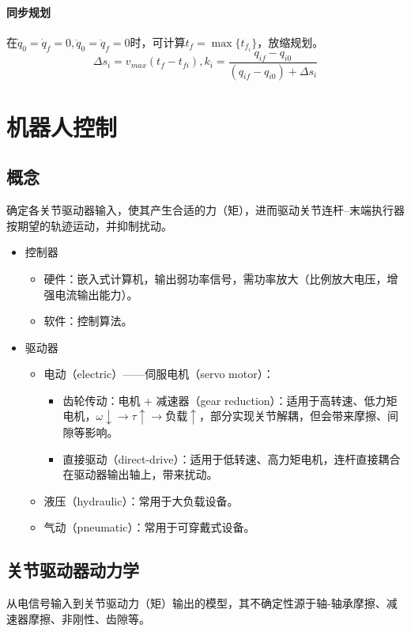 \documentclass[
12pt, %
a4paper, 
oneside, %
headinclude,footinclude, %
]{scrartcl}
\begin{document}
\paragraph{同步规划}
在$ \dot{q}_0 = \dot{q}_f = 0, \ddot{q}_0 = \ddot{q}_f = 0 $时，可计算$ t_f = \max\{t_{f_i}\} $，放缩规划。
$$ \Delta s_i = v_{max}(t_f - t_{fi}), k_i = \frac{q_{if} - q_{i0}}{(q_{if} - q_{i0}) + \Delta s_i} $$
\section{机器人控制}
\subsection[概念]{概念}
确定各关节驱动器输入，使其产生合适的力（矩），进而驱动关节连杆--末端执行器按期望的轨迹运动，并抑制扰动。
\begin{itemize}
\item 控制器
\begin{itemize}
\item 硬件：嵌入式计算机，输出弱功率信号，需功率放大（比例放大电压，增强电流输出能力）。
\item 软件：控制算法。
\end{itemize}
\item 驱动器
\begin{itemize}
\item 电动（electric）——伺服电机（servo motor）：
\begin{itemize}
\item 齿轮传动：电机 + 减速器（gear reduction）：适用于高转速、低力矩电机，$ \omega \downarrow \rightarrow \tau \uparrow \rightarrow \text{负载} \uparrow $，部分实现关节解耦，但会带来摩擦、间隙等影响。
\item 直接驱动（direct-drive）：适用于低转速、高力矩电机，连杆直接耦合在驱动器输出轴上，带来扰动。
\end{itemize}
\item 液压（hydraulic）：常用于大负载设备。
\item 气动（pneumatic）：常用于可穿戴式设备。
\end{itemize}
\end{itemize}
\subsection[关节驱动器动力学]{关节驱动器动力学}
从电信号输入到关节驱动力（矩）输出的模型，其不确定性源于轴-轴承摩擦、减速器摩擦、非刚性、齿隙等。
\end{document}
